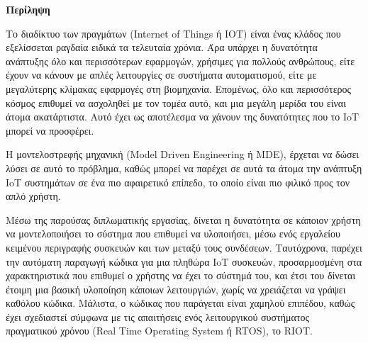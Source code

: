 \begin{center}
  \centering

  \vspace{0.5cm}
  \centering
  \textbf{\Large{Περίληψη}}

  \vspace{1cm}

\end{center}

Το διαδίκτυο των πραγμάτων (Internet of Things ή IOT) είναι ένας κλάδος που εξελίσσεται ραγδαία ειδικά τα τελευταία χρόνια. Άρα υπάρχει η δυνατότητα ανάπτυξης όλο και περισσότερων εφαρμογών, χρήσιμες για πολλούς ανθρώπους, είτε έχουν να κάνουν με απλές λειτουργίες σε συστήματα αυτοματισμού, είτε με μεγαλύτερης κλίμακας εφαρμογές στη βιομηχανία. Επομένως, όλο και περισσότερος κόσμος επιθυμεί να ασχοληθεί με τον τομέα αυτό, και μια μεγάλη μερίδα του είναι άτομα ακατάρτιστα. Αυτό έχει ως αποτέλεσμα να χάνουν της δυνατότητες που το IoT μπορεί να προσφέρει.

Η μοντελοστρεφής μηχανική (Model Driven Engineering ή MDE), έρχεται να δώσει λύσει σε αυτό το πρόβλημα, καθώς μπορεί να παρέχει σε αυτά τα άτομα την ανάπτυξη IoT συστημάτων σε ένα πιο αφαιρετικό επίπεδο, το οποίο είναι πιο φιλικό προς τον απλό χρήστη.

Μέσω της παρούσας διπλωματικής εργασίας, δίνεται η δυνατότητα σε κάποιον χρήστη να μοντελοποιήσει το σύστημα που επιθυμεί να υλοποιήσει, μέσω ενός εργαλείου κειμένου περιγραφής συσκευών και των μεταξύ τους συνδέσεων. Ταυτόχρονα, παρέχει την αυτόματη παραγωγή κώδικα για μια πληθώρα IoT συσκευών, προσαρμοσμένη στα χαρακτηριστικά που επιθυμεί ο χρήστης να έχει το σύστημά του, και έτσι του δίνεται έτοιμη μια βασική υλοποίηση κάποιων λειτουργιών, χωρίς να χρειάζεται να γράψει καθόλου κώδικα. Μάλιστα, ο κώδικας που παράγεται είναι χαμηλού επιπέδου, καθώς έχει σχεδιαστεί σύμφωνα με τις απαιτήσεις ενός λειτουργικού συστήματος πραγματικού χρόνου (Real Time Operating System ή RTOS), το RIOT.